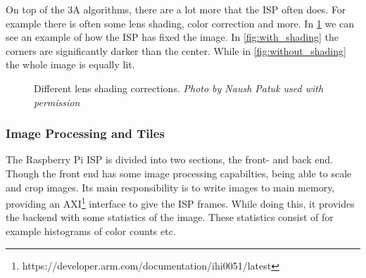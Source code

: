 On top of the 3A algorithms, there are a lot more that the ISP often does. For
example there is often some lens shading, color correction and more. In
\cref{fig:lens_shading} we can see an example of how the ISP has fixed the image.
In \cref{fig:with_shading} the corners are significantly darker than the center.
While in \cref{fig:without_shading} the whole image is equally lit.

\begin{figure}[htpb]
    \centering
    \qquad

    \caption{Different lens shading corrections. \textit{Photo by Naush Patuk used with permission}}\label{fig:lens_shading}
\end{figure}

\subsubsection{Image Processing and Tiles}
The Raspberry Pi ISP is divided into two sections, the front- and back end.
Though the front end has some image processing capabilties, being able to scale
and crop images. Its main responsibility is to write images to main memory,
providing an
AXI\footnote{https://developer.arm.com/documentation/ihi0051/latest} interface
to give the ISP frames. While doing this, it provides the backend with some
statistics of the image. These statistics consist of for example histograms
of color counts etc.

